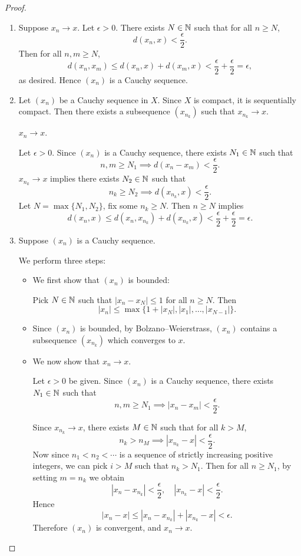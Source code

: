 \begin{proof} \
\begin{enumerate}[label=(\roman*)]
\item Suppose $x_n\to x$. Let $\epsilon>0$. There exists $N\in\mathbb N$ such that for all $n\ge N$,
\[d(x_n,x)<\frac{\epsilon}{2}.\]
Then for all $n,m\ge N$,
\[d(x_n,x_m)\le d(x_n,x)+d(x_m,x)<\frac{\epsilon}{2}+\frac{\epsilon}{2}=\epsilon,\]
as desired. Hence $(x_n)$ is a Cauchy sequence.
\item Let $(x_n)$ be a Cauchy sequence in $X$. Since $X$ is compact, it is sequentially compact. Then there exists a subsequence $(x_{n_k})$ such that $x_{n_k}\to x$.
\begin{claim}
$x_n\to x$.
\end{claim}
Let $\epsilon>0$. Since $(x_n)$ is a Cauchy sequence, there exists $N_1\in\mathbb N$ such that
\[n,m\ge N_1\implies d(x_n-x_m)<\frac{\epsilon}{2}.\]
$x_{n_k}\to x$ implies there exists $N_2\in\mathbb N$ such that
\[n_k\ge N_2\implies d(x_{n_k},x)<\frac{\epsilon}{2}.\]
Let $N=\max\{N_1,N_2\}$, fix some $n_k\ge N$. Then $n\ge N$ implies
\[d(x_n,x)\le d(x_n,x_{n_k})+d(x_{n_k},x)<\frac{\epsilon}{2}+\frac{\epsilon}{2}=\epsilon.\]

\item Suppose $(x_n)$ is a Cauchy sequence.

We perform three steps:
\begin{itemize}
\item We first show that $(x_n)$ is bounded:

Pick $N\in\mathbb N$ such that $|x_n-x_N|\le 1$ for all $n\ge N$. Then
\[|x_n|\le\max\{1+|x_N|,|x_1|,\dots,|x_{N-1}|\}.\]

\item Since $(x_n)$ is bounded, by Bolzano--Weierstrass, $(x_n)$ contains a subsequence $(x_{n_k})$ which converges to $x$.

\item We now show that $x_n\to x$.

Let $\epsilon>0$ be given. Since $(x_n)$ is a Cauchy sequence, there exists $N_1\in\mathbb N$ such that
\[n,m\ge N_1\implies|x_n-x_m|<\frac{\epsilon}{2}.\]

Since $x_{n_k}\to x$, there exists $M\in\mathbb N$ such that for all $k>M$,
\[n_k>n_M\implies |x_{n_k}-x|<\frac{\epsilon}{2}.\]
Now since $n_1<n_2<\cdots$ is a sequence of strictly increasing positive integers, we can pick $i>M$ such that $n_k>N_1$. Then for all $n\ge N_1$, by setting $m=n_k$ we obtain
\[ |x_n-x_{n_k}|<\frac{\epsilon}{2},\quad |x_{n_k}-x| < \frac{\epsilon}{2}.\]
Hence
\[|x_n-x|\le|x_n-x_{n_k}|+|x_{n_k}-x|<\epsilon.\]
Therefore $(x_n)$ is convergent, and $x_n\to x$.
\end{itemize}
\end{enumerate}
\end{proof}

